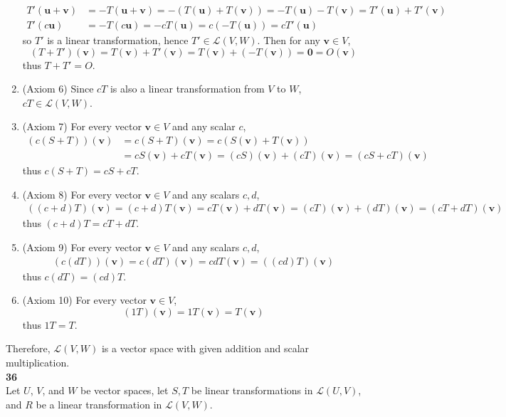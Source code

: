 \begin{enumerate}
\begin{align*}
		T'(\textbf{u} + \textbf{v}) &= -T(\textbf{u} + \textbf{v}) = -(T(\textbf{u}) + T(\textbf{v})) = -T(\textbf{u}) - T(\textbf{v}) = T'(\textbf{u}) + T'(\textbf{v}) \\
		T'(c\textbf{u}) &= -T(c\textbf{u}) = -cT(\textbf{u}) = c(-T(\textbf{u})) = cT'(\textbf{u})
	\end{align*} so $T'$ is a linear transformation, hence $T' \in \mathscr{L}(V,W)$. Then for any $\textbf{v} \in V$, \begin{equation*}
		(T + T')(\textbf{v}) = T(\textbf{v}) + T'(\textbf{v}) = T(\textbf{v}) + (-T(\textbf{v})) = \textbf{0} = O(\textbf{v})
	\end{equation*} thus $T + T' = O$.
	\item (Axiom 6) Since $cT$ is also a linear transformation from $V$ to $W$, $cT \in \mathscr{L}(V, W)$.
	\item (Axiom 7) For every vector $\textbf{v} \in V$ and any scalar $c$, \begin{align*}
		(c(S + T))(\textbf{v}) &= c(S + T)(\textbf{v}) = c(S(\textbf{v}) + T(\textbf{v})) \\
		&= cS(\textbf{v}) + cT(\textbf{v}) = (cS)(\textbf{v}) + (cT)(\textbf{v}) = (cS + cT)(\textbf{v})
	\end{align*} thus $c(S + T) = cS + cT$.
	\item (Axiom 8) For every vector $\textbf{v} \in V$ and any scalars $c, d$, \begin{align*}
		((c + d)T)(\textbf{v}) = (c + d)T(\textbf{v}) = cT(\textbf{v}) + dT(\textbf{v}) = (cT)(\textbf{v}) + (dT)(\textbf{v}) = (cT + dT)(\textbf{v})
	\end{align*} thus $(c + d)T = cT + dT$.
	\item (Axiom 9) For every vector $\textbf{v} \in V$ and any scalars $c, d$, \begin{align*}
		(c(dT))(\textbf{v}) = c(dT)(\textbf{v}) = cdT(\textbf{v}) = ((cd)T)(\textbf{v})
	\end{align*} thus $c(dT) = (cd)T$.
	\item (Axiom 10) For every vector $\textbf{v} \in V$, \begin{equation*}
		(1T)(\textbf{v}) = 1T(\textbf{v}) = T(\textbf{v})
	\end{equation*} thus $1T = T$.
\end{enumerate}
Therefore, $\mathscr{L}(V, W)$ is a vector space with given addition and scalar multiplication. \\

\textbf{36} \\
Let $U$, $V$, and $W$ be vector spaces, let $S, T$ be linear transformations in $\mathscr{L}(U, V)$, and $R$ be a linear transformation in $\mathscr{L}(V, W)$. \\


